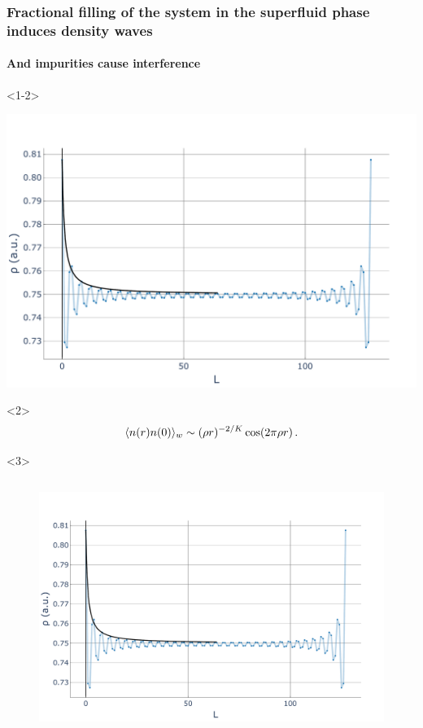 \documentclass[aspectratio=169]{beamer}
\begin{document}
\begin{frame}
  \frametitle{Fractional filling of the system in the superfluid phase induces density waves}
  \framesubtitle<3>{And impurities cause interference}
  \begin{onlyenv}<1-2>
    \begin{center}
      \includegraphics[scale=0.22]{../img/Density-profiles-fractional-density.pdf}
    \end{center}
  \end{onlyenv}
  \begin{onlyenv}<2>
    \begin{equation}
      \langle n(r)n(0) \rangle_w \sim (\rho r)^{-2/K} \cos(2\pi\rho r) \thinspace .
      \label{eq:waves}
    \end{equation}
  \end{onlyenv}
  \begin{onlyenv}<3>
    \begin{columns}[onlytextwidth]
      \begin{column}{0.5\textwidth}
        \begin{figure}[ht]
          \centering
          \includegraphics[scale=0.2]{../img/Density-profiles-fractional-density.pdf}

\end{figure}
\end{column}
\end{columns}
\end{onlyenv}
\end{frame}
\end{document}
